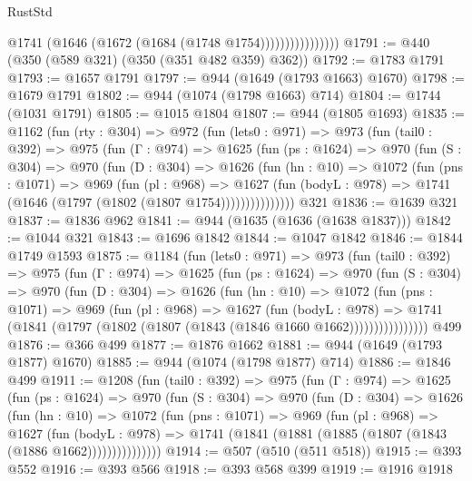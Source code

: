 \begin{lexlean}{RustStd}
\begin{coremodule}
{\begin{coremodule}
{{{{{{{{{{                          @1741 (@1646 (@1672 (@1684 (@1748 @1754))))))))))))))))
@1791 := @440 (@350 (@589 @321) (@350 (@351 @482 @359) @362))
@1792 := @1783 @1791
@1793 := @1657 @1791
@1797 := @944 (@1649 (@1793 @1663) @1670)
@1798 := @1679 @1791
@1802 := @944 (@1074 (@1798 @1663) @714)
@1804 := @1744 (@1031 @1791)
@1805 := @1015 @1804
@1807 := @944 (@1805 @1693)
@1835 := @1162
    (fun (rty : @304) =>
    @972
      (fun (lets0 : @971) =>
      @973
        (fun (tail0 : @392) =>
        @975
          (fun (Γ : @974) =>
          @1625
            (fun (ps : @1624) =>
            @970
              (fun (S : @304) =>
              @970
                (fun (D : @304) =>
                @1626
                  (fun (hn : @10) =>
                  @1072
                    (fun (pns : @1071) =>
                    @969
                      (fun (pl : @968) =>
                      @1627
                        (fun (bodyL : @978) =>
                        @1741 (@1646 (@1797 (@1802 (@1807 @1754)))))))))))))))
    @321
@1836 := @1639 @321
@1837 := @1836 @962
@1841 := @944 (@1635 (@1636 (@1638 @1837)))
@1842 := @1044 @321
@1843 := @1696 @1842
@1844 := @1047 @1842
@1846 := @1844 @1749 @1593
@1875 := @1184
    (fun (lets0 : @971) =>
    @973
      (fun (tail0 : @392) =>
      @975
        (fun (Γ : @974) =>
        @1625
          (fun (ps : @1624) =>
          @970
            (fun (S : @304) =>
            @970
              (fun (D : @304) =>
              @1626
                (fun (hn : @10) =>
                @1072
                  (fun (pns : @1071) =>
                  @969
                    (fun (pl : @968) =>
                    @1627
                      (fun (bodyL : @978) =>
                      @1741 (@1841 (@1797 (@1802 (@1807 (@1843 (@1846 @1660 @1662))))))))))))))))
    @499
@1876 := @366 @499
@1877 := @1876 @1662
@1881 := @944 (@1649 (@1793 @1877) @1670)
@1885 := @944 (@1074 (@1798 @1877) @714)
@1886 := @1846 @499
@1911 := @1208
    (fun (tail0 : @392) =>
    @975
      (fun (Γ : @974) =>
      @1625
        (fun (ps : @1624) =>
        @970
          (fun (S : @304) =>
          @970
            (fun (D : @304) =>
            @1626
              (fun (hn : @10) =>
              @1072
                (fun (pns : @1071) =>
                @969
                  (fun (pl : @968) =>
                  @1627
                    (fun (bodyL : @978) =>
                    @1741 (@1841 (@1881 (@1885 (@1807 (@1843 (@1886 @1662)))))))))))))))
@1914 := @507 (@510 (@511 @518))
@1915 := @393 @552
@1916 := @393 @566
@1918 := @393 @568 @399
@1919 := @1916 @1918
}}}}}}}}}}
\end{coremodule}}
\end{coremodule}
\end{lexlean}
